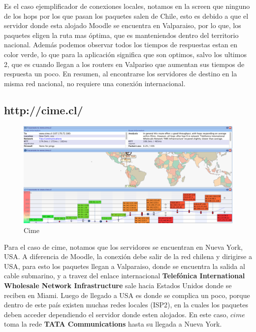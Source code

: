 \documentclass[a4papaer]{article}
\begin{document}
Es el caso ejemplificador de conexiones locales, notamos en la screen que ninguno de los hops por los que pasan los paquetes salen de Chile, esto es debido a que el servidor donde esta alojado Moodle se encuentra en Valparaiso, por lo que, los paquetes eligen la ruta mas óptima, que es manteniendos dentro del territorio nacional. Además podemos observar todos los tiempos de respuestas estan en color verde, lo que para la aplicación significa que son optimos, salvo los ultimos 2, que es cuando llegan a los routers en Valpariso que aumentan sus tiempos de respuesta un poco. En resumen, al encontrarse los servidores de destino en la misma red nacional, no requiere una conexión internacional.

\pagebreak

\subsection{http://cime.cl/}


\begin{figure}[h]
  \centering
    \includegraphics[width=1\textwidth]{ss2}
  \caption{Cime}
  \label{fig:Trace Route de http://cime.cl/}
\end{figure}



Para el caso de cime, notamos que los servidores se encuentran en Nueva York, USA. A diferencia de Moodle, la conexión debe salir de la red chilena y dirigirse a USA, para esto los paquetes llegan a Valparaiso, donde se encuentra la salida al cable submarino, y a travez del enlace internacional  \textbf{Telefónica International Wholesale Network Infrastructure} sale hacia Estados Unidos donde se reciben en Miami. Luego de llegado a USA es donde se complica un poco, porque dentro de este país existen muchas redes locales (ISP2), en la cuales los paquetes deben acceder dependiendo el servidor donde esten alojados. En este caso, $cime$ toma la rede \textbf{TATA Communications} hasta su llegada a Nueva York.
 
\end{document}
